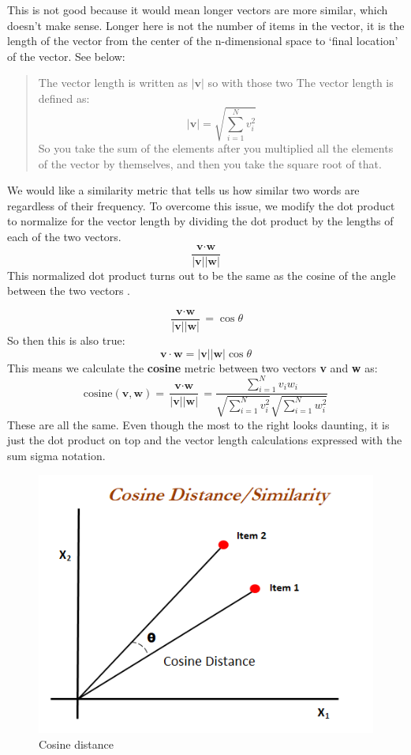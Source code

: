 \documentclass[
  11pt,
  british,
]{article}
\begin{document}
This is not good because it would mean longer vectors are more similar,
which doesn't make sense. Longer here is not the number of items in the
vector, it is the length of the vector from the center of the
n-dimensional space to `final location' of the vector. See below:

\begin{quote}
The vector length is written as \(|\textbf{v}|\) so with those two
\textbar{} \textbar{} The vector length is defined as:
\[|\textbf{v}| = \sqrt{\sum\limits^{N}_{i=1}{v^2_i}}\] So you take the
sum of the elements after you multiplied all the elements of the vector
by themselves, and then you take the square root of that.
\end{quote}

We would like a similarity metric that tells us how similar two words
are regardless of their frequency. To overcome this issue, we modify the
dot product to normalize for the vector length by dividing the dot
product by the lengths of each of the two vectors.
\[\frac{\textbf{v} \cdot \textbf{w}}{|\textbf{v}||\textbf{w}|}\] This
normalized dot product turns out to be the same as the cosine of the
angle between the two vectors .

\[\frac{\textbf{v} \cdot \textbf{w}}{|\textbf{v}||\textbf{w}|} = \cos{\theta}\]
So then this is also
true:\[\textbf{v} \cdot \textbf{w} = |\textbf{v}||\textbf{w}| \cos{\theta}\]
This means we calculate the \textbf{cosine} metric between two vectors
\textbf{v} and \textbf{w} as:
\[\text{cosine}(\textbf{v},\textbf{w}) = \frac{\textbf{v} \cdot \textbf{w}}{|\textbf{v}||\textbf{w}|} = \frac{\sum\limits^N_{i=1}{v_iw_i}}{\sqrt{\sum\limits^N_{i=1}{v_i^2}}\sqrt{\sum\limits^N_{i=1}{w_i^2}}}\]
These are all the same. Even though the most to the right looks
daunting, it is just the dot product on top and the vector length
calculations expressed with the sum sigma notation.

\begin{figure}
\centering
\includegraphics{Pasted_image_20220606220028.png}
\caption{Cosine distance}
\end{figure}
\end{document}
